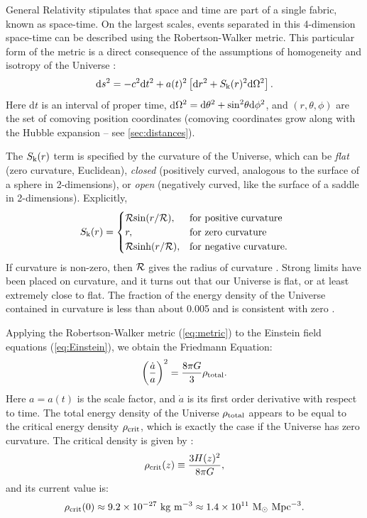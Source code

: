 General Relativity stipulates that space and time are part of a single fabric, known as space-time. On the largest scales, events separated in this 4-dimension space-time can be described using the Robertson-Walker metric. This particular form of the metric is a direct consequence of the assumptions of homogeneity and isotropy of the Universe \citep[e.g.][]{Bertone05}:
\begin{equation}
{\rm d}s^2 = -c^2 {\rm d}t^2 +a(t)^2 \left[{\rm d}r^2 + S_{\rm k}(r)^2{\rm d}\Omega^2\right].
\label{eq:metric}
\end{equation}
Here d$t$ is an interval of proper time, d$\Omega^2 = {\rm d}\theta^2 + {\rm sin}^2\theta {\rm d}\phi^2$, and $(r,\theta,\phi)$ are the set of comoving position coordinates (comoving coordinates grow along with the Hubble expansion -- see \autoref{sec:distances}). 

The $S_{\rm k}(r)$ term is specified by the curvature of the Universe, which can be {\it flat} (zero curvature, Euclidean), {\it closed} (positively curved, analogous to the surface of a sphere in 2-dimensions), or {\it open} (negatively curved, like the surface of a saddle in 2-dimensions). Explicitly,
\begin{equation}
S_{\rm k}(r) = 
    \begin{cases}
        {\cal R}{\rm sin}(r/{\cal R}), & \text{for positive curvature} \\
        r,              & \text{for zero curvature} \\
        {\cal R}{\rm sinh}(r/{\cal R}), & \text{for negative curvature.}
    \end{cases}
\end{equation}
If curvature is non-zero, then $\cal R$ gives the radius of curvature \citep{RydenText}. Strong limits have been placed on curvature, and it turns out that our Universe is flat, or at least extremely close to flat. The fraction of the energy density of the Universe contained in curvature is less than about 0.005 and is consistent with zero \citep{PlanckXIII_15}.

Applying the Robertson-Walker metric (\autoref{eq:metric}) to the Einstein field equations (\autoref{eq:Einstein}), we obtain the Friedmann Equation:
\begin{equation}
\left( \frac{\dot a}{a} \right)^2 = \frac{8\pi G}{3} \rho_{\rm total}.
\end{equation}
Here $a=a(t)$ is the scale factor, and $\dot a$ is its first order derivative with respect to time. The total energy density of the Universe $\rho_{\rm total}$ appears to be equal to the critical energy density $\rho_{\rm crit}$, which is exactly the case if the Universe has zero curvature. The critical density is given by \citep{RydenText}:
\begin{equation}
\rho_{\rm crit}(z) \equiv \frac{3H(z)^2}{8\pi G},
\end{equation}
and its current value is:
\begin{equation}
\rho_{\rm crit}(0) \approx 9.2 \times 10^{-27}\ {\rm kg}\ {\rm m}^{-3} \approx 1.4 \times 10^{11}\ {\rm M}_{\odot}\ {\rm Mpc}^{-3}.
\end{equation}

